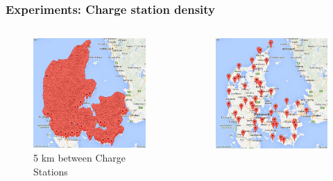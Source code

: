 \begin{frame}
  \frametitle{Experiments: Charge station density}
  \begin{columns}[c]
  	\begin{center}
  		\begin{figure}
	  	\includegraphics[scale=0.3]{images/density5km}
	  	\caption{5 km between Charge Stations}
	  	\end{figure} 
  	\end{center}
   \begin{center}
   		\begin{figure}
	  	\includegraphics[scale=0.3]{images/density50km} 

\end{figure}
\end{center}
\end{columns}
\end{frame}
